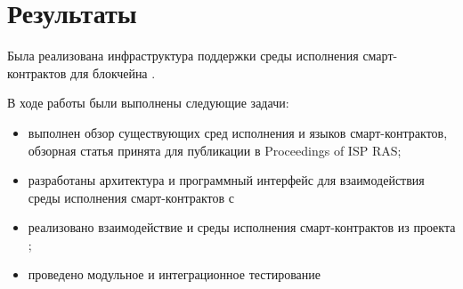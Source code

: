 \section{Результаты}
Была реализована инфраструктура поддержки среды исполнения смарт-контрактов для блокчейна .

В ходе работы были выполнены следующие задачи:
\begin{itemize}
    \item выполнен обзор существующих сред исполнения и языков смарт-контрактов, обзорная статья принята для публикации в Pro\-ceed\-ings of ISP RAS;
    \item разработаны архитектура и программный интерфейс для взаимодействия среды исполнения смарт-контрактов с 
    \item реализовано взаимодействие  и среды исполнения смарт-контрактов из проекта ;
    \item проведено модульное и интеграционное тестирование 
\end{itemize}

